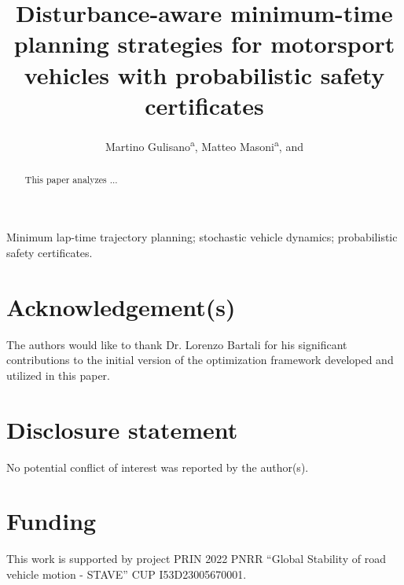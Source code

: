 \documentclass[]{interact}
\theoremstyle{plain}%
\theoremstyle{definition}
\theoremstyle{remark}
\begin{document}

\title{Disturbance-aware minimum-time planning strategies for motorsport vehicles with probabilistic safety certificates}

\author{Martino Gulisano\textsuperscript{a}, Matteo Masoni\textsuperscript{a}, and 
}

\maketitle

\begin{abstract}
This paper analyzes ...
\end{abstract}

\begin{keywords}
Minimum lap-time trajectory planning; stochastic vehicle dynamics; probabilistic safety certificates.
\end{keywords}










\section*{Acknowledgement(s)}

The authors would like to thank Dr. Lorenzo Bartali for his significant contributions to the initial version of the optimization framework developed and utilized in this paper.


\section*{Disclosure statement}

No potential conflict of interest was reported by the author(s).

\section*{Funding}

This work is supported by project PRIN 2022 PNRR ``Global Stability of road vehicle motion - STAVE'' CUP I53D23005670001.
\end{document}
